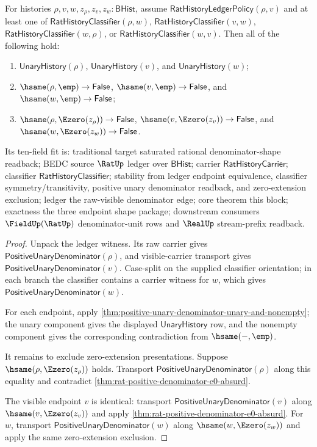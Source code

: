 \begin{theorem}
\label{thm:rat-ledger-saturated-denominator-shape-package}
For histories $\rho,v,w,z_\rho,z_v,z_w:\mathsf{BHist}$, assume
$\mathsf{RatHistoryLedgerPolicy}(\rho,v)$ and at least one of
$\mathsf{RatHistoryClassifier}(\rho,w)$,
$\mathsf{RatHistoryClassifier}(v,w)$,
$\mathsf{RatHistoryClassifier}(w,\rho)$, or
$\mathsf{RatHistoryClassifier}(w,v)$. Then
all of the following hold:
\begin{enumerate}
\item $\mathsf{UnaryHistory}(\rho)$, $\mathsf{UnaryHistory}(v)$, and
$\mathsf{UnaryHistory}(w)$;
\item $\hsame(\rho,\emp)\to\mathsf{False}$,
$\hsame(v,\emp)\to\mathsf{False}$, and
$\hsame(w,\emp)\to\mathsf{False}$;
\item $\hsame(\rho,\Ezero(z_\rho))\to\mathsf{False}$,
$\hsame(v,\Ezero(z_v))\to\mathsf{False}$, and
$\hsame(w,\Ezero(z_w))\to\mathsf{False}$.
\end{enumerate}

Its ten-field fit is: traditional target saturated rational denominator-shape
readback; BEDC source $\RatUp$ ledger over $\mathsf{BHist}$; carrier
$\mathsf{RatHistoryCarrier}$; classifier $\mathsf{RatHistoryClassifier}$;
stability from ledger endpoint equivalence, classifier symmetry/transitivity,
positive unary denominator readback, and zero-extension exclusion; ledger the
raw-visible denominator edge; core theorem this block; exactness the three
endpoint shape package; downstream consumers $\FieldUp(\RatUp)$
denominator-unit rows and $\RealUp$ stream-prefix readback.
\end{theorem}
\begin{proof}
Unpack the ledger witness. Its raw carrier gives
$\mathsf{PositiveUnaryDenominator}(\rho)$, and visible-carrier transport gives
$\mathsf{PositiveUnaryDenominator}(v)$. Case-split on the supplied classifier
orientation; in each branch the classifier contains a carrier witness for
$w$, which gives $\mathsf{PositiveUnaryDenominator}(w)$.

For each endpoint, apply
\autoref{thm:positive-unary-denominator-unary-and-nonempty}; the unary component
gives the displayed $\mathsf{UnaryHistory}$ row, and the nonempty component
gives the corresponding contradiction from $\hsame(-,\emp)$.

It remains to exclude zero-extension presentations. Suppose
$\hsame(\rho,\Ezero(z_\rho))$ holds. Transport
$\mathsf{PositiveUnaryDenominator}(\rho)$ along this equality and contradict
\autoref{thm:rat-positive-denominator-e0-absurd}.

The visible endpoint $v$ is identical: transport
$\mathsf{PositiveUnaryDenominator}(v)$ along $\hsame(v,\Ezero(z_v))$ and apply
\autoref{thm:rat-positive-denominator-e0-absurd}. For $w$, transport
$\mathsf{PositiveUnaryDenominator}(w)$ along $\hsame(w,\Ezero(z_w))$ and apply
the same zero-extension exclusion.
\end{proof}

